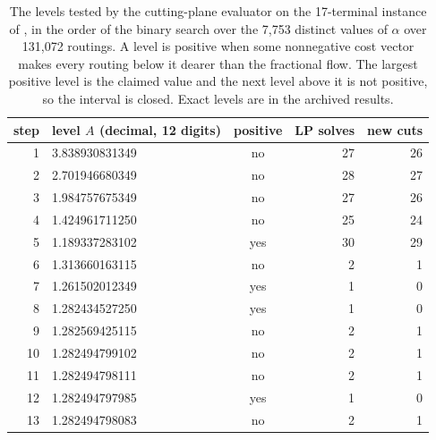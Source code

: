 \begin{table}[t]
\centering\footnotesize
\begin{tabular}{@{}rlcrr@{}}
\toprule
step & level $A$ (decimal, 12 digits) & positive & LP solves & new cuts\\
\midrule
1 & 3.838930831349 & no & 27 & 26\\
2 & 2.701946680349 & no & 28 & 27\\
3 & 1.984757675349 & no & 27 & 26\\
4 & 1.424961711250 & no & 25 & 24\\
5 & 1.189337283102 & yes & 30 & 29\\
6 & 1.313660163115 & no & 2 & 1\\
7 & 1.261502012349 & yes & 1 & 0\\
8 & 1.282434527250 & yes & 1 & 0\\
9 & 1.282569425115 & no & 2 & 1\\
10 & 1.282494799102 & no & 2 & 1\\
11 & 1.282494798111 & no & 2 & 1\\
12 & 1.282494797985 & yes & 1 & 0\\
13 & 1.282494798083 & no & 2 & 1\\
\bottomrule
\end{tabular}
\caption{The levels tested by the cutting-plane evaluator on the 17-terminal instance of \cite{Nik2}, in the order of the binary search over the 7{,}753 distinct values of $\alpha$ over 131{,}072 routings. A level is positive when some nonnegative cost vector makes every routing below it dearer than the fractional flow. The largest positive level is the claimed value and the next level above it is not positive, so the interval is closed. Exact levels are in the archived results.}
\label{tab:levels}
\end{table}
